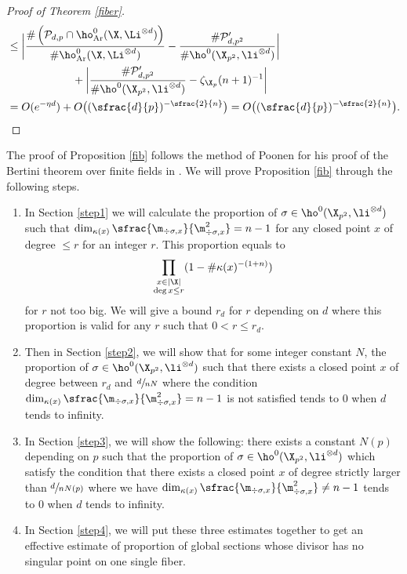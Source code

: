\begin{proof}[Proof of Theorem \ref{fiber}]
\begin{align*}
&\leq \biggl| \frac{\#\left(\mathcal{P}_{d,p}\cap \ho^0_{\mathrm{Ar}}(\X, \Li^{\otimes d})\right)}{\#\ho^0_{\mathrm{Ar}}(\X, \Li^{\otimes d})} -\frac{\#\mathcal{P}'_{d,p^2} }{\#\ho^0(\X_{p^2}, \li^{\otimes d})} \biggr|\\
&\hspace*{2.1cm}+\biggl| \frac{\#\mathcal{P}'_{d,p^2}}{\#\ho^0(\X_{p^2}, \li^{\otimes d})} -\zeta_{\X_p}(n+1)^{-1} \biggr| \\
&=O(e^{-\eta d})+O\bigl((\sfrac{d}{p})^{-\sfrac{2}{n}} \bigr)=O\bigl((\sfrac{d}{p})^{-\sfrac{2}{n}} \bigr).\qedhere
\end{align*}
\end{proof}

The proof of Proposition \ref{fib} follows the method of Poonen for his proof of the Bertini theorem over finite fields in \cite{Po04}.
We will prove Proposition \ref{fib} through the following steps.
\begin{enumerate}
\item In Section \ref{step1} we will calculate the proportion of $\sigma\in \ho^0(\X_{p^2}, \li^{\otimes d})$ such that $ \dim_{\kappa(x)}\sfrac{\m_{\div \sigma,x}}{\m^2_{\div \sigma, x}}=n-1$ for any closed point $x$ of degree $\leq r$ for an integer $r$. This proportion equals to
\[
\prod_{\substack{x\in |\X|\\ \deg x\leq r}}(1-\#\kappa(x)^{-(1+n)})
\]
for $r$ not too big. We will give a bound $r_d$ for $r$ depending on $d$ where this proportion is valid for any $r$ such that $0<r\leq r_d$.
\item Then in Section \ref{step2}, we will show that for some integer constant $N$, the proportion of $\sigma\in \ho^0(\X_{p^2}, \li^{\otimes d})$ such that there exists a closed point $x$ of degree between $r_d$ and $\sfrac{d}{nN}$ where the condition $ \dim_{\kappa(x)}\sfrac{\m_{\div \sigma,x}}{\m^2_{\div \sigma, x}}=n-1$ is not satisfied tends to $0$ when $d$ tends to infinity.
\item In Section \ref{step3}, we will show the following: there exists a constant $N(p)$ depending on $p$ such that the proportion of $\sigma\in \ho^0(\X_{p^2}, \li^{\otimes d})$ which satisfy the condition that there exists a closed point $x$ of degree strictly larger than $\sfrac{d}{nN(p)}$ where we have $ \dim_{\kappa(x)}\sfrac{\m_{\div \sigma,x}}{\m^2_{\div \sigma, x}}\not=n-1$ tends to $0$ when $d$ tends to infinity.
\item In Section \ref{step4}, we will put these three estimates together to get an effective estimate of proportion of global sections whose divisor has no singular point on one single fiber.
\end{enumerate}

